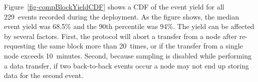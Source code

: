 Figure~\ref{fig-compBlockYieldCDF} shows a CDF of the event 
yield for all 229~events recorded during the deployment.  As the
figure shows, the median event yield was 68.5\% and the 90th
percentile was 94\%.  The yield can be affected by several factors.
First, the protocol will abort a transfer from a node after
re-requesting the same block more than 20~times, or if the transfer
from a single node exceeds 10~minutes.  Second, because sampling is
disabled while performing a data transfer, if two back-to-back events
occur a node may not end up storing data for the second event.






